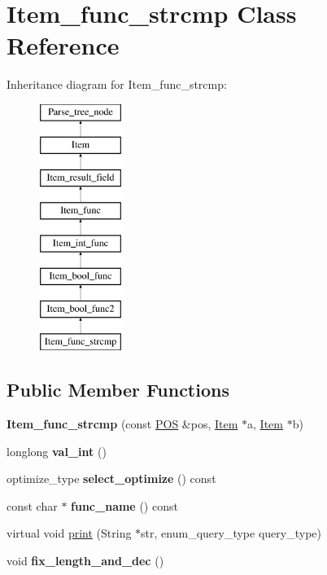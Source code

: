 \hypertarget{classItem__func__strcmp}{}\section{Item\+\_\+func\+\_\+strcmp Class Reference}
\label{classItem__func__strcmp}
Inheritance diagram for Item\+\_\+func\+\_\+strcmp\+:\begin{figure}[H]
\begin{center}
\leavevmode
\includegraphics[height=8.000000cm]{classItem__func__strcmp}
\end{center}
\end{figure}
\subsection*{Public Member Functions}
\begin{DoxyCompactItemize}
\item 
\mbox{\label{classItem__func__strcmp_acf7efbec385ac2e930e9f11dd138d76a}} 
{\bfseries Item\+\_\+func\+\_\+strcmp} (const \mbox{\hyperlink{structYYLTYPE}{P\+OS}} \&pos, \mbox{\hyperlink{classItem}{Item}} $\ast$a, \mbox{\hyperlink{classItem}{Item}} $\ast$b)
\item 
\mbox{\label{classItem__func__strcmp_a23d8d91b448bbaaffcd78dd0d87022b3}} 
longlong {\bfseries val\+\_\+int} ()
\item 
\mbox{\label{classItem__func__strcmp_af7b6549a1d6ea7089401c2ff425c0a6a}} 
optimize\+\_\+type {\bfseries select\+\_\+optimize} () const
\item 
\mbox{\label{classItem__func__strcmp_abe11a176c55ce416774fab834aa6923e}} 
const char $\ast$ {\bfseries func\+\_\+name} () const
\item 
virtual void \mbox{\hyperlink{classItem__func__strcmp_a524a65bbd7fcff131c5ba9547cfe79e4}{print}} (String $\ast$str, enum\+\_\+query\+\_\+type query\+\_\+type)
\item 
\mbox{\label{classItem__func__strcmp_a5d35a2dec9343d752da7d0b18ebc0a2e}} 
void {\bfseries fix\+\_\+length\+\_\+and\+\_\+dec} ()
\end{DoxyCompactItemize}
